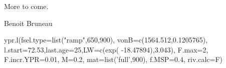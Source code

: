 \documentclass[a4paper]{book}
\begin{document}
%
\begin{Details}\relax
More to come.
\end{Details}
%
\begin{Author}\relax
Benoit Bruneau
\end{Author}
%
\begin{Examples}
\begin{ExampleCode}

ypr.l(fsel.type=list("ramp",650,900), vonB=c(1564.512,0.1205765), 
      l.start=72.53,last.age=25,LW=c(exp( -18.47894),3.043), F.max=2,
      F.incr.YPR=0.01, M=0.2, mat=list('full',900), f.MSP=0.4, riv.calc=F) 

\end{ExampleCode}
\end{Examples}
\printindex{}
\end{document}

